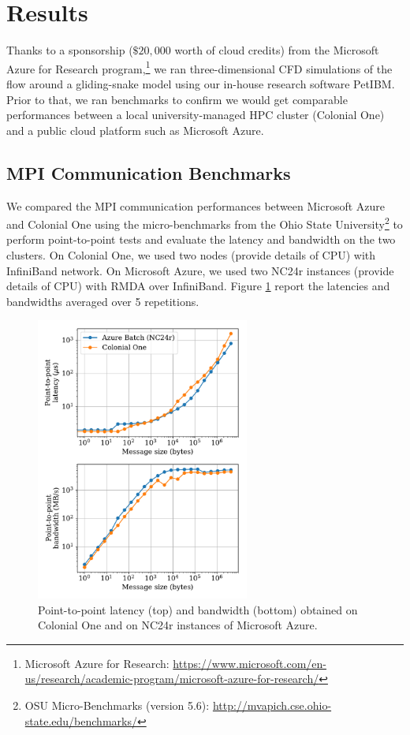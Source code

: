 \documentclass[10pt,journal,compsoc]{IEEEtran}
\begin{document}
\section{Results}\label{sec:results}

Thanks to a sponsorship ($\$20,000$ worth of cloud credits) from the Microsoft Azure for Research program,\footnote{Microsoft Azure for Research: \url{https://www.microsoft.com/en-us/research/academic-program/microsoft-azure-for-research/}} we ran three-dimensional CFD simulations of the flow around a gliding-snake model using our in-house research software PetIBM.
Prior to that, we ran benchmarks to confirm we would get comparable performances between a local university-managed HPC cluster (Colonial One) and a public cloud platform such as Microsoft Azure.

\subsection{MPI Communication Benchmarks}\label{subsec:mpi_benchmarks}

We compared the MPI communication performances between Microsoft Azure and Colonial One using the micro-benchmarks from the Ohio State University\footnote{OSU Micro-Benchmarks (version 5.6): \url{http://mvapich.cse.ohio-state.edu/benchmarks/}} to perform point-to-point tests and evaluate the latency and bandwidth on the two clusters.
On Colonial One, we used two nodes (provide details of CPU) with InfiniBand network.
On Microsoft Azure, we used two NC24r instances (provide details of CPU) with RMDA over InfiniBand.
Figure \ref{fig:osu_benchmarks} report the latencies and bandwidths averaged over 5 repetitions.

\begin{figure}[!h]
    \centering
    \includegraphics[width=7cm]{figures/osu_latency_bandwidth.pdf}
    \caption{Point-to-point latency (top) and bandwidth (bottom) obtained on Colonial One and on NC24r instances of Microsoft Azure.}
    \label{fig:osu_benchmarks}
\end{figure}
\end{document}
